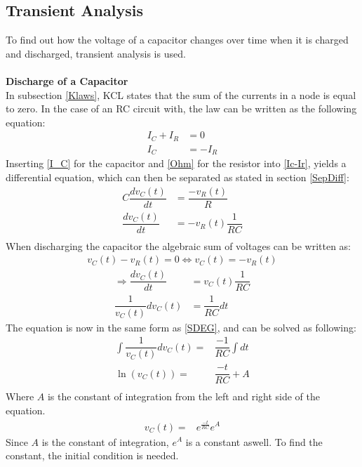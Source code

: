 \subsection{Transient Analysis}
\label{sec371}
To find out how the voltage of a capacitor changes over time when it is charged and discharged, transient analysis is used.
\\
\\
\textbf{Discharge of a Capacitor}\\
In subsection \ref{Klaws}, KCL states that the sum of the currents in a node is equal to zero. In the case of an RC circuit with, the law can be written as the following equation:
\begin{align}
I_{C}+I_{R}&=0 \nonumber \\
I_{C}&= -I_{R} \label{Ic-Ir}
\end{align}
Inserting \eqref{I_C} for the capacitor and \eqref{Ohm} for the resistor into \eqref{Ic-Ir}, yields a differential equation, which can then be separated as stated in section \ref{SepDiff}:
\begin{align*}
C \dfrac{dv_C(t)}{dt}&=\dfrac{-v_R(t)}{R} \\
\dfrac{dv_C(t)}{dt} &= -v_R(t)\dfrac{1}{RC} \\
\end{align*}
When discharging the capacitor the algebraic sum of voltages can be written as:
\begin{align*}
v_C(t)-v_R(t)=0 \Leftrightarrow v_C(t)=-v_R(t)
\end{align*}
\begin{align*}
\Rightarrow
\dfrac{dv_C(t)}{dt} &= v_C(t)\dfrac{1}{RC} \\
\dfrac{1}{v_C(t)}dv_C(t)&=\dfrac{1}{RC}dt
\end{align*}
The equation is now in the same form as \eqref{SDEG}, and can be solved as following:
\begin{align*}
\int \dfrac{1}{v_C(t)}dv_C(t) =& \dfrac{-1}{RC} \int dt\nonumber \\
\ln(v_C(t)) =& \dfrac{-t}{RC} + A \nonumber\\
\end{align*}
Where $A$ is the constant of integration from the left and right side of the equation.
\begin{align}
v_C(t) =& e^{\frac{-t}{RC}}e^{A}\label{V_eA}
\end{align}
Since $A$ is the constant of integration, $e^A$ is a constant aswell. To find the constant, the initial condition is needed. 
\\
